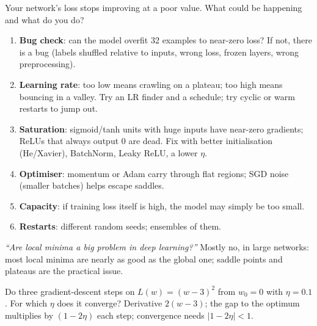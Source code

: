 \begin{qa}{ Your network's loss stops improving at a poor value. What could be happening
and what do you do?}
\why
\begin{enumerate}
\item \textbf{Bug check}: can the model overfit 32 examples to near-zero loss? If not, there is a bug (labels shuffled
  relative to inputs, wrong loss, frozen layers, wrong preprocessing).
\item \textbf{Learning rate}: too low means crawling on a plateau; too high means bouncing in a valley. Try an LR finder
  and a schedule; try cyclic or warm restarts to jump out.
\item \textbf{Saturation}: sigmoid/tanh units with huge inputs have near-zero gradients; ReLUs that always output 0 are
  dead. Fix with better initialisation (He/Xavier), BatchNorm, Leaky ReLU, a lower $\eta$.
\item \textbf{Optimiser}: momentum or Adam carry through flat regions; SGD noise (smaller batches) helps escape saddles.
\item \textbf{Capacity}: if training loss itself is high, the model may simply be too small.
\item \textbf{Restarts}: different random seeds; ensembles of them.
\end{enumerate}
\pushes \emph{``Are local minima a big problem in deep learning?''} Mostly no, in large networks: most local minima are
nearly as good as the global one; saddle points and plateaus are the practical issue.
\end{qa}

\begin{qa}{Do three gradient-descent steps on $L(w) = (w - 3)^2$ from $w_0 = 0$ with $\eta = 0.1$. For which $\eta$ does it
converge?}
\why Derivative $2(w-3)$; the gap to the optimum multiplies by $(1 - 2\eta)$ each step; convergence needs $|1 - 2\eta| <
1$.
\end{qa}


